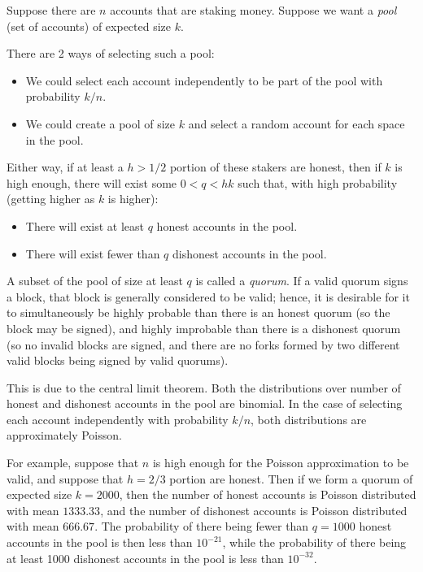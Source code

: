 \documentclass{article}
\begin{document}
Suppose there are $n$ accounts that are staking money.  Suppose we want a \textit{pool} (set of accounts) of expected size $k$.

There are 2 ways of selecting such a pool:

\begin{itemize}
  \item We could select each account independently to be part of the pool with probability $k/n$.
  \item We could create a pool of size $k$ and select a random account for each space in the pool.
\end{itemize}

Either way, if at least a  $h > 1/2$ portion of these stakers are honest, then if $k$ is high enough, there will exist some $0 < q < hk$ such that, with high probability (getting higher as $k$ is higher):

\begin{itemize}
  \item There will exist at least $q$ honest accounts in the pool.
  \item There will exist fewer than $q$ dishonest accounts in the pool.
\end{itemize}

A subset of the pool of size at least $q$ is called a \textit{quorum}.  If a valid quorum signs a block, that block is generally considered to be valid;
hence, it is desirable for it to simultaneously be highly probable than there is an honest quorum (so the block may be signed), and highly improbable
than there is a dishonest quorum (so no invalid blocks are signed, and there are no forks formed by two different valid blocks being signed by valid quorums).

This is due to the central limit theorem.  Both the distributions over number of honest and dishonest accounts in the pool are binomial.
In the case of selecting each account independently with probability $k/n$, both distributions are approximately Poisson.

For example, suppose that $n$ is high enough for the Poisson approximation to be valid, and suppose that $h = 2/3$ portion are honest.
Then if we form a quorum of expected size $k = 2000$, then the number of honest accounts is Poisson distributed with mean $1333.33$,
and the number of dishonest accounts is Poisson distributed with mean $666.67$.
The probability of there being fewer than $q = 1000$ honest accounts in the pool is then less than $10^{-21}$, while the probability of 
there being at least 1000 dishonest accounts in the pool is less than $10^{-32}$.
\end{document}
